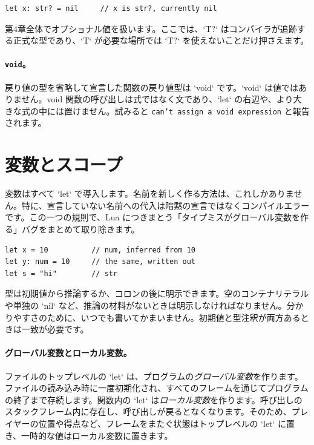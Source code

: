 \begin{lstlisting}[language=wick]
let x: str? = nil     // x is str?, currently nil
\end{lstlisting}

\noindent
第4章全体でオプショナル値を扱います。ここでは、`T?` はコンパイラが追跡する正式な型であり、`T` が必要な場所では `T?` を使えないことだけ押さえます。

\paragraph{\texttt{void}。} 戻り値の型を省略して宣言した関数の戻り値型は `void` です。`void` は値ではありません。void 関数の呼び出しは式ではなく文であり、`let` の右辺や、より大きな式の中には置けません。試みると \texttt{can't assign a void expression} と報告されます。

\section{変数とスコープ}

変数はすべて `let` で導入します。名前を新しく作る方法は、これしかありません。特に、宣言していない名前への代入は暗黙の宣言ではなくコンパイルエラーです。この一つの規則で、Lua につきまとう「タイプミスがグローバル変数を作る」バグをまとめて取り除きます。

\begin{lstlisting}[language=wick]
let x = 10          // num, inferred from 10
let y: num = 10     // the same, written out
let s = "hi"        // str
\end{lstlisting}

\noindent
型は初期値から推論するか、コロンの後に明示できます。空のコンテナリテラルや単独の `nil` など、推論の材料がないときは明示しなければなりません。分かりやすさのために、いつでも書いてかまいません。初期値と型注釈が両方あるときは一致が必要です。

\paragraph{グローバル変数とローカル変数。} ファイルのトップレベルの `let` は、プログラムの\emph{グローバル変数}を作ります。ファイルの読み込み時に一度初期化され、すべてのフレームを通じてプログラムの終了まで存続します。関数内の `let` は\emph{ローカル変数}を作ります。呼び出しのスタックフレーム内に存在し、呼び出しが戻るとなくなります。そのため、プレイヤーの位置や得点など、フレームをまたぐ状態はトップレベルの `let` に置き、一時的な値はローカル変数に置きます。

